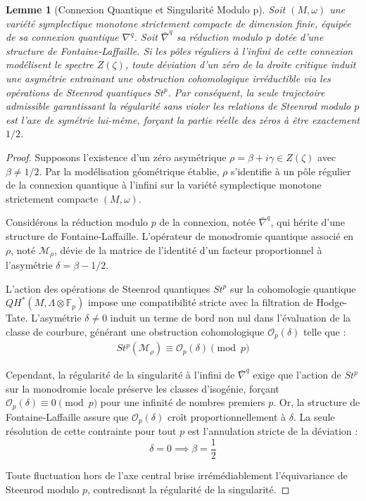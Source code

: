 \documentclass[
]{article}
\newtheorem{lemma}{Lemme}
\begin{document}
\begin{lemma}[Connexion Quantique et Singularité Modulo p]
Soit $(M, \omega)$ une variété symplectique monotone strictement compacte de dimension finie, équipée de sa connexion quantique $\nabla^q$. Soit $\bar{\nabla}^q$ sa réduction modulo $p$ dotée d'une structure de Fontaine-Laffaille. Si les pôles réguliers à l'infini de cette connexion modélisent le spectre $Z(\zeta)$, toute déviation d'un zéro de la droite critique induit une asymétrie entrainant une obstruction cohomologique irréductible via les opérations de Steenrod quantiques $St^p$. Par conséquent, la seule trajectoire admissible garantissant la régularité sans violer les relations de Steenrod modulo $p$ est l'axe de symétrie lui-même, forçant la partie réelle des zéros à être exactement $1/2$.
\end{lemma}

\begin{proof}
Supposons l'existence d'un zéro asymétrique $\rho = \beta + i\gamma \in Z(\zeta)$ avec $\beta \neq 1/2$. Par la modélisation géométrique établie, $\rho$ s'identifie à un pôle régulier de la connexion quantique à l'infini sur la variété symplectique monotone strictement compacte $(M, \omega)$.

Considérons la réduction modulo $p$ de la connexion, notée $\bar{\nabla}^q$, qui hérite d'une structure de Fontaine-Laffaille. L'opérateur de monodromie quantique associé en $\rho$, noté $\mathcal{M}_\rho$, dévie de la matrice de l'identité d'un facteur proportionnel à l'asymétrie $\delta = \beta - 1/2$.

L'action des opérations de Steenrod quantiques $St^p$ sur la cohomologie quantique $QH^*(M, \Lambda \otimes \mathbb{F}_p)$ impose une compatibilité stricte avec la filtration de Hodge-Tate. L'asymétrie $\delta \neq 0$ induit un terme de bord non nul dans l'évaluation de la classe de courbure, générant une obstruction cohomologique $\mathcal{O}_p(\delta)$ telle que :
\begin{align*}
St^p(\mathcal{M}_\rho) \equiv \mathcal{O}_p(\delta) \pmod{p}
\end{align*}

Cependant, la régularité de la singularité à l'infini de $\bar{\nabla}^q$ exige que l'action de $St^p$ sur la monodromie locale préserve les classes d'isogénie, forçant $\mathcal{O}_p(\delta) \equiv 0 \pmod{p}$ pour une infinité de nombres premiers $p$.
Or, la structure de Fontaine-Laffaille assure que $\mathcal{O}_p(\delta)$ croît proportionnellement à $\delta$. La seule résolution de cette contrainte pour tout $p$ est l'annulation stricte de la déviation :
\begin{equation*}
\delta = 0 \implies \beta = \frac{1}{2}
\end{equation*}

Toute fluctuation hors de l'axe central brise irrémédiablement l'équivariance de Steenrod modulo $p$, contredisant la régularité de la singularité.
\end{proof}
\end{document}
